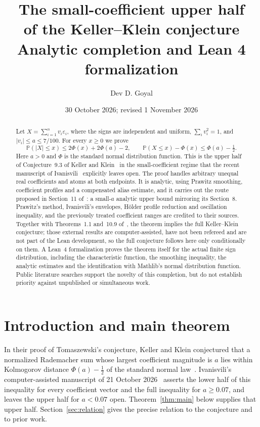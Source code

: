 \documentclass[11pt]{article}
\title{\textbf{The small-coefficient upper half\\of the Keller--Klein conjecture}\\[6pt]
\large Analytic completion and Lean 4 formalization}
\author{Dev D. Goyal}
\date{30 October 2026; revised 1 November 2026}
\newcommand{\Pp}{\mathbb P}
\begin{document}
\maketitle

\begin{abstract}
Let $X=\sum_{i=1}^n v_i\varepsilon_i$, where the signs are independent and uniform,
$\sum_i v_i^2=1$, and $|v_i|\le a\le7/100$. For every $x\ge0$ we prove
\[
 \Pp(|X|\le x)\le 2\Phi(x)+2\Phi(a)-2,
 \qquad
 \Pp(X\le x)-\Phi(x)\le\Phi(a)-\tfrac12.
\]
Here $a>0$ and $\Phi$ is the standard normal distribution function. This is
the upper half of Conjecture~9.3 of Keller and Klein~\cite{KK} in the
small-coefficient regime that the recent manuscript of Ivanisvili~\cite{I}
explicitly leaves open. The proof handles arbitrary unequal real coefficients
and atoms at both endpoints. It is analytic, using Prawitz smoothing,
coefficient profiles and a compensated alias estimate, and it carries out the
route proposed in Section~11 of~\cite{I}: a small-$a$ analytic upper bound
mirroring its Section~8. Prawitz's method, Ivanisvili's envelopes, Hölder
profile reduction and oscillation inequality, and the previously treated
coefficient ranges are credited to their sources. Together with Theorems~1.1
and~10.9 of~\cite{I}, the theorem implies the full Keller--Klein conjecture;
those external results are computer-assisted, have not been refereed and are
not part of the Lean development, so the full conjecture follows here only
conditionally on them. A Lean~4 formalization proves the theorem itself for
the actual finite sign distribution, including the characteristic function,
the smoothing inequality, the analytic estimates and the identification with
Mathlib's normal distribution function. Public literature searches support
the novelty of this completion, but do not establish priority against
unpublished or simultaneous work.
\end{abstract}

\section{Introduction and main theorem}\label{sec:intro}

In their proof of Tomaszewski's conjecture, Keller and Klein conjectured that
a normalized Rademacher sum whose largest coefficient magnitude is $a$ lies
within Kolmogorov distance $\Phi(a)-\tfrac12$ of the standard normal
law~\cite[Conjecture~9.3]{KK}. Ivanisvili's computer-assisted manuscript of
21 October 2026~\cite{I} asserts the lower half of this inequality for every
coefficient vector and the full inequality for $a\ge0.07$, and leaves the
upper half for $a<0.07$ open. Theorem~\ref{thm:main} below supplies that upper half.
Section~\ref{sec:relation} gives the precise relation to the conjecture and to
prior work.
\end{document}
